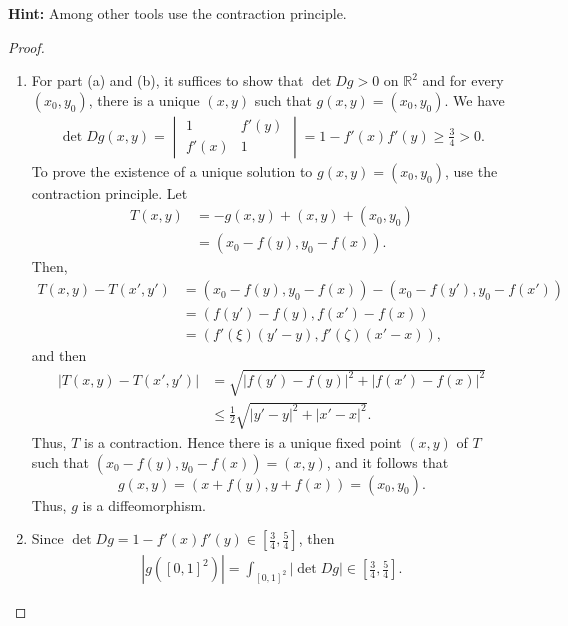 \documentclass[12pt,leqno]{amsart}
\theoremstyle{definition}
\begin{document}
\noindent
{\bf Hint:} Among other tools use the contraction principle.
\begin{proof}
~\begin{enumerate}[label=(\alph*)]
    \item For part (a) and (b), it suffices to show that $\det Dg > 0$ on $\mathbb{R}^2$ and for every $(x_0, y_0)$, there is a unique $(x,y)$ such that $g(x,y) = (x_0, y_0)$. We have
    \begin{align*}
        \det Dg(x,y) = \begin{vmatrix}
            1 & f'(y) \\
            f'(x) & 1
        \end{vmatrix} = 1 - f'(x)f'(y) \geq \frac{3}{4} > 0.
    \end{align*}
    To prove the existence of a unique solution to $g(x,y) = (x_0, y_0)$, use the contraction principle. Let
    \begin{align*}
        T(x,y) & = - g(x,y) + (x,y) + (x_0, y_0) \\
        & = (x_0-f(y), y_0-f(x)).
    \end{align*}
    Then,
    \begin{align*}
        T(x,y) - T(x',y') & = (x_0-f(y), y_0-f(x)) - (x_0-f(y'), y_0-f(x')) \\
        & = (f(y') - f(y), f(x') - f(x)) \\
        & = \left(f'(\xi)(y'-y), f'(\zeta)(x'-x)\right),
    \end{align*}
    and then 
    \begin{align*}
        \left|T(x,y) - T(x',y')\right| & = \sqrt{|f(y') - f(y)|^2 + |f(x') - f(x)|^2} \\
        & \leq \frac{1}{2} \sqrt{|y' - y|^2 + |x' - x|^2}.
    \end{align*}
    Thus, $T$ is a contraction. Hence there is a unique fixed point $(x,y)$ of $T$ such that $(x_0-f(y), y_0-f(x)) = (x,y)$, and it follows that $$g(x,y) = (x+f(y), y+f(x)) = (x_0, y_0).$$ Thus, $g$ is a diffeomorphism.
    
    \setcounter{enumi}{2}
    \item Since $\det Dg = 1 - f'(x)f'(y) \in \left[\frac{3}{4}, \frac{5}{4}\right]$, then
    \begin{align*}
        \left|g([0,1]^2)\right| = \int_{[0,1]^2} |\det Dg| \in \left[\frac{3}{4}, \frac{5}{4}\right].
    \end{align*}
\end{enumerate}
\end{proof}
\end{document}
